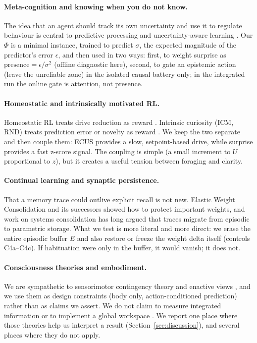 \documentclass[11pt,a4paper]{article}
\begin{document}
\paragraph{Meta-cognition and knowing when you do not know.} The idea that an agent should track its own uncertainty and use it to regulate behaviour is central to predictive processing and uncertainty-aware learning \cite{friston2010, laukkonen2025}. Our $\Phi$ is a minimal instance, trained to predict $\sigma$, the expected magnitude of the predictor's error $\epsilon$, and then used in two ways: first, to weight surprise as $\mathrm{presence} = \epsilon / \sigma^2$ (offline diagnostic here), second, to gate an epistemic action (leave the unreliable zone) in the isolated causal battery only; in the integrated run the online gate is attention, not presence.

\paragraph{Homeostatic and intrinsically motivated RL.} Homeostatic RL treats drive reduction as reward \cite{kernelan2014, man2016}. Intrinsic curiosity (ICM, RND) treats prediction error or novelty as reward \cite{pathak2017, burda2018}. We keep the two separate and then couple them: ECUS provides a slow, setpoint-based drive, while surprise provides a fast z-score signal. The coupling is simple (a small increment to $U$ proportional to $z$), but it creates a useful tension between foraging and clarity.

\paragraph{Continual learning and synaptic persistence.} That a memory trace could outlive explicit recall is not new. Elastic Weight Consolidation \cite{kirkpatrick2017} and its successors showed how to protect important weights, and work on systems consolidation has long argued that traces migrate from episodic to parametric storage. What we test is more literal and more direct: we erase the entire episodic buffer $E$ and also restore or freeze the weight delta itself (controls C4a--C4c). If habituation were only in the buffer, it would vanish; it does not.

\paragraph{Consciousness theories and embodiment.} We are sympathetic to sensorimotor contingency theory \cite{oregan2001} and enactive views \cite{thompson2007}, and we use them as design constraints (body only, action-conditioned prediction) rather than as claims we assert. We do not claim to measure integrated information \cite{tononi2014} or to implement a global workspace \cite{baars1988, dehaene2011}. We report one place where those theories help us interpret a result (Section~\ref{sec:discussion}), and several places where they do not apply.
\end{document}
